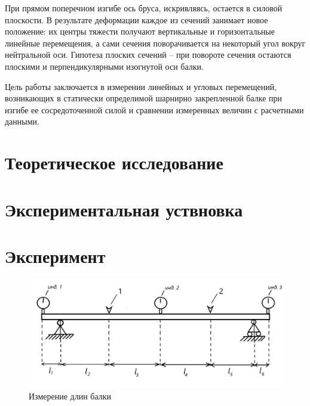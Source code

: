 \documentclass[12pt, a4paper]{article}
\begin{document}
    При прямом поперечном изгибе ось бруса, искривляясь, остается в силовой плоскости. В результате деформации каждое из сечений занимает новое положение: их центры тяжести получают вертикальные и горизонтальные линейные перемещения, а сами сечения поворачивается на некоторый угол вокруг нейтральной оси.
    Гипотеза плоских сечений -- при повороте сечения остаются плоскими и перпендикулярными изогнутой оси балки.
    
    Цель работы заключается в измерении линейных и угловых перемещений, возникающих в статически определимой шарнирно закрепленной балке при изгибе ее сосредоточенной силой и сравнении измеренных величин с расчетными данными.
    
    \newpage
    \section{Теоретическое исследование}
    
    \newpage
    \section{Экспериментальная уствновка}
    
    \newpage
    \section{Эксперимент}
    
    \begin{figure}[h]
    	\centering
    	\includegraphics[width = 15cm]{pic_1.png}
    	\caption{Измерение длин балки}
    	\label{wow_picture}
    \end{figure}
    
\end{document}
